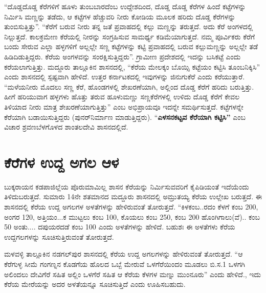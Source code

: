 “ದೊಡ್ಡದೊಡ್ಡ ಕೆರೆಗಳಿಗೆ ಹೂಳು ತುಂಬಬಾರದೆಂಬ ಉದ್ದೇಶದಿಂದ, ದೊಡ್ಡ ದೊಡ್ಡ ಕೆರೆಗಳ ಹಿಂದೆ ಕಟ್ಟೆಗಳನ್ನು ನಿರ್ಮಿಸಿ ಮಣ್ಣನ್ನು ತಡೆದು, ಆ ಕಟ್ಟೆಗಳ ಹೆಚ್ಚುವರಿ ನೀರು ಕೋಡಿಯ ಮೂಲಕ ಹರಿದು ದೊಡ್ಡ ಕೆರೆಗಳನ್ನು ತುಂಬಿಸುತ್ತಿತ್ತು”. “ಕೆರೆಗೆ ಬರುವ ನೀರು ತನ್ನ ಜತೆ ಪ್ರವಾಹದಲ್ಲಿ ಕಲ್ಲು ಮಣ್ಣನ್ನು ತರುತ್ತದೆ. ಅದು ಕೆರೆ ಅಂಗಳದಲ್ಲಿ ನಿಲ್ಲುತ್ತದೆ. ಕಾಲಕ್ರಮೇಣ ಕೆರೆಯಲ್ಲಿ ನೀರನ್ನು ಸಂಗ್ರಹಿಸುವ ಸಾಮರ್ಥ್ಯ ಕಡಿಮೆಯಾಗುತ್ತದೆ. ನಮ್ಮ ಪೂರ್ವಿಕರು ಕೆರೆಗೆ ಬಂದು ಸೇರುವ ಎಲ್ಲಾ ಹಳ್ಳಗಳಿಗೆ ಅಲ್ಲಲ್ಲೇ ಸಣ್ಣ ಕಟ್ಟೆಗಳನ್ನು ಕಟ್ಟಿ ಪ್ರವಾಹದಲ್ಲಿ ಬರುವ ಕಲ್ಲುಮಣ್ಣನ್ನು ಅಲ್ಲಲ್ಲೇ ತಡೆ ಹಿಡಿದಿಡುತ್ತಿದ್ದರು. ಕೆರೆಯ ಅಂಗಳವನ್ನು ಸಂರಕ್ಷಿಸುತ್ತಿದ್ದರು”. ಗ್ರಾಮೀಣ ಪ್ರದೇಶದಲ್ಲಿ ಇದನ್ನು ಬಸಿಕಟ್ಟೆ ಎಂದು ಕರೆಯಲಾಗುತ್ತಿತ್ತು. ಮದ್ದೂರು ತಾಲ್ಲೂಕಿನ ಶಾಸನದಲ್ಲಿ, “ಕೆರೆಯ ಮೇಲಕ್ಕಂ ಬೊಯ್ಸಿ ಕಟ್ಟೆಯಂ ಕಟ್ಟಿಸಿ ತೂಂಬನಿಕ್ಕಿಸಿ” ಎಂದು ಶಾಸನದಲ್ಲಿ ಸ್ಪಷ್ಟವಾಗಿ ಹೇಳಿದೆ. ಉತ್ತರ ಕರ್ನಾಟಕದಲ್ಲಿ ಇವುಗಳನ್ನು ಜಿನುಗುಕೆರೆ ಎಂದು ಕರೆಯುತ್ತಾರೆ. “ಮಳೆಯನೀರು ಮೊದಲು ಸಣ್ಣ ಕೆರೆ, ಹೊಂಡಗಳಲ್ಲಿ ಶೇಖರಣೆಯಾಗಿ, ಅಲ್ಲಿಂದ ದೊಡ್ಡ ಕೆರೆಗೆ ಹರಿದು ಬರುತ್ತಿತ್ತು. ಹೀಗೆ ಹರಿಯುವಾಗ ಹಳ್ಳಗಳು ಹೊತ್ತು ತರುವ ಹೂಳುಮಣ್ಣು ಸಣ್ಣಕೆರೆಗಳಲ್ಲಿ ಉಳಿದು ದೊಡ್ಡ ಕೆರೆಗೆ ಕೇವಲ ತಿಳಿಯಾದ ನೀರು ಮಾತ್ರ ಶೇಖರಣೆಯಾಗುತ್ತಿತ್ತು” ಎಂಬ ಅಭಿಪ್ರಾಯವೂ ಇದನ್ನೇ ಸಮರ್ಥಿಸುತ್ತದೆ. ಕಟ್ಟೆಗಳನ್ನೇ ಕೆರೆಯಾಗಿ ಬಡಾಯಿಸುತ್ತಿದ್ದರು (ಪುನರ್​ನಿರ್ಮಾಣ ಮಾಡುತ್ತಿದ್ದರು). “\textbf{ಎಳಸನಕಟ್ಟವ ಕೆರೆಯಾಗಿ ಕಟ್ಟಿಸಿ”} ಎಂಬ ವಿಚಾರ ಶ್ರವಣಬೆಳಗೊಳದ ಶಾಂತಲದೇವಿ ಶಾಸನದಲ್ಲಿದೆ.


\section{ಕೆರೆಗಳ ಉದ್ದ ಅಗಲ ಆಳ}

ಬುಕ್ಕರಾಯನ ಕಡಪಾಜಿಲ್ಲೆಯ ಪೊರುಮಾಮಿಲ್ಲ ಶಾಸನ ಕೆರೆಯನ್ನು ನಿರ್ಮಿಸುವವರಿಗೆ ಕೈಪಿಡಿಯಂತೆ ಇದೆಯೆಂದು ತಿಳಿದು\-ಬರುತ್ತದೆ. ಸುಮಾರು 14ನೇ ಶತಮಾನದ ಮದ್ದೂರು ಶಾಸನದಲ್ಲಿ ಅಮ್ರುತಯ್ಯ ಕೆರೆಯ ಉಲ್ಲೇಖ ಬರುತ್ತದೆ. ಈ ಶಾಸನದಲ್ಲಿ ಕೆರೆಯ ಉದ್ದ ಅಗಲಗಳ ಅಳತೆಗಳನ್ನು ಹೇಳಿರುವಂತೆ ತೋರುತ್ತದೆ. “ಕಿಳಕಂಬ..ರದಂ ಕೆಳಗೆ ಕಂಬ 200, ಅಂಗರ 120, ಅತ್ತಿಯಂ...ಕ ಮುಟ್ಟಲು ಕಂಬ 100, ಕೊಯಲು ಕಂಬ 250, ಕಂಬ 200 ಹೊಂಗಿಗಾಲು(ವೆ).. ಕಂಬ 50 ಅಂತು.... ದಪುಯರದಡೆ ಕಂಬ 100 ಎಂದು ಅಳತೆಗಳನ್ನು ಹೇಳಿದೆ. ಬಹುಶಃ ಈ ಅಳತೆಗಳು ಕೆರೆಯ ಉದ್ದಗಲಗಳನ್ನು ಸೂಚಿಸುತ್ತಿರುವಂತೆ ತೋರುತ್ತದೆ.

ಮಳವಳ್ಳಿ ತಾಲ್ಲೂಕಿನ ನಡಗಲ್​ಪುರ ಶಾಸನದಲ್ಲಿ ಕೆರೆಯ ಉದ್ದ ಅಗಲಗಳನ್ನು ಹೇಳಿರುವಂತೆ ತೋರುತ್ತದೆ. “ಆ ಕೆರೆಗುಳ್ಳ ಸೀಮೆ ಗಂಗಣ್ನನ ಕೊಡಗೆಯ ಹೊಲದ ಒಬ್ಬೆ ಮೇರುವೆ ಒಳಗೆರೆಯಿಂದಂ ಮೂಡಲು ಬಿ.ಸ.1 ಒಳಗಗಿ ಅಲಿಂದಲು ದೇವಿಗೆರೆ ಸಹಿತ ಅಲ್ಲಿಂ ಒಳಗೆರೆ ಸಹಿತ ಆ ಕೆರೆಯ ಕೆಳಗಳ ಮಣ್ನು ಮುಂನೂರು” ಎಂದು ಹೇಳಿದೆ., ಇದು ಕೆರೆಯ ಮೇರೆಯನ್ನು ಅದರ ಅಳತೆಯನ್ನೂ ಸೂಚಿಸುತ್ತಿದೆ ಎಂದು ಊಹಿಸಬಹುದು.


